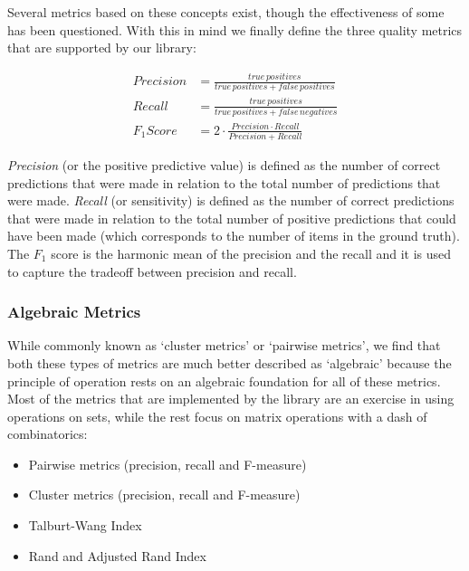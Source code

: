 \documentclass[a4paper,twoside]{article}
\begin{document}
    Several metrics based on these concepts exist, though the effectiveness of
    some has been questioned\cite{Goga2015}.
    With this in mind we finally define the three quality metrics that are
    supported by our library:

    \begin{align}
    Precision&=\frac{true\,positives}{true\,positives + false\,positives} \\
    Recall&=\frac{true\,positives}{true\,positives + false\,negatives} \\
    F_1 Score&=2 \cdot \frac{Precision \cdot Recall}{Precision+Recall}
    \end{align}

    \textit{Precision} (or the positive predictive value) is defined as the
    number of correct predictions that were made in relation to the total number
    of predictions that were made.
    \textit{Recall} (or sensitivity) is defined as the number of correct
    predictions that were made in relation to the total number of positive
    predictions that could have been made (which corresponds to the number of
    items in the ground truth).
    The \textit{$F_1$} score is the harmonic mean of the precision and the
    recall and it is used to capture the tradeoff between precision and
    recall\cite{hitesh2012}.

    \subsubsection{Algebraic Metrics}
    While commonly known as `cluster metrics'\cite{rand1971,hitesh2012} or
    `pairwise metrics'\cite{hitesh2012,Men10}, we find that both these types of
    metrics are much better described as `algebraic' because the principle of
    operation rests on an algebraic foundation for all of these metrics.
    Most of the metrics that are implemented by the library are an exercise in
    using operations on sets, while the rest focus on matrix operations with a
    dash of combinatorics:
    \begin{itemize}
        \item Pairwise metrics (precision, recall and F-measure)\cite{Men10,hitesh2012}
        \item Cluster metrics (precision, recall and F-measure)\cite{huang2006efficient,hitesh2012}
        \item Talburt-Wang Index\cite{tal2007algebraic}
        \item Rand\cite{rand1971} and Adjusted Rand Index\cite{adjrand1985}
    \end{itemize}
\end{document}
